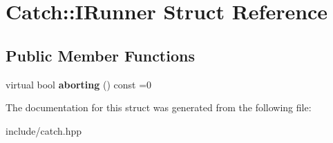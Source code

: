 \hypertarget{structCatch_1_1IRunner}{}\section{Catch\+:\+:I\+Runner Struct Reference}
\label{structCatch_1_1IRunner}
\subsection*{Public Member Functions}
\begin{DoxyCompactItemize}
\item 
virtual bool {\bfseries aborting} () const =0\hypertarget{structCatch_1_1IRunner_a03713202dd2e041e30b8030088ab0116}{}\label{structCatch_1_1IRunner_a03713202dd2e041e30b8030088ab0116}

\end{DoxyCompactItemize}


The documentation for this struct was generated from the following file\+:\begin{DoxyCompactItemize}
\item 
include/catch.\+hpp\end{DoxyCompactItemize}
